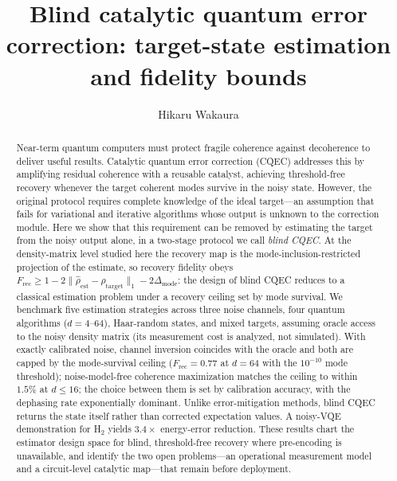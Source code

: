 \documentclass[pra,twocolumn,superscriptaddress,longbibliography,floatfix,nofootinbib]{revtex4-2}
\newcommand{\Frec}{F_\mathrm{rec}}
\newcommand{\rhot}{\rho_\mathrm{target}}
\newcommand{\rhoe}{\hat{\rho}_\mathrm{est}}
\begin{document}
\title{Blind catalytic quantum error correction: target-state estimation and fidelity bounds}

\author{Hikaru Wakaura}

\begin{abstract}
Near-term quantum computers must protect fragile coherence against decoherence to deliver useful results. 
Catalytic quantum error correction (CQEC) addresses this by amplifying residual coherence with a reusable catalyst, achieving threshold-free recovery whenever the target coherent modes survive in the noisy state. 
However, the original protocol requires complete knowledge of the ideal target---an assumption that fails for variational and iterative algorithms whose output is unknown to the correction module.
Here we show that this requirement can be removed by estimating the target from the noisy output alone, in a two-stage protocol we call \emph{blind CQEC}.
At the density-matrix level studied here the recovery map is the mode-inclusion-restricted projection of the estimate, so recovery fidelity obeys $\Frec \geq 1 - 2\|\rhoe - \rhot\|_1 - 2\Delta_\mathrm{mode}$: the design of blind CQEC reduces to a classical estimation problem under a recovery ceiling set by mode survival.  
We benchmark five estimation strategies across three noise channels, four quantum algorithms ($d = 4$--$64$), Haar-random states, and mixed targets, assuming oracle access to the noisy density matrix (its measurement cost is analyzed, not simulated).
With exactly calibrated noise, channel inversion coincides with the oracle and both are capped by the mode-survival ceiling ($\Frec = 0.77$ at $d = 64$ with the $10^{-10}$ mode threshold); noise-model-free coherence maximization matches the ceiling to within $1.5\%$ at $d \leq 16$; the choice between them is set by calibration accuracy, with the dephasing rate exponentially dominant.
Unlike error-mitigation methods, blind CQEC returns the state itself rather than corrected expectation values.
A noisy-VQE demonstration for H$_2$ yields $3.4\times$ energy-error reduction.
These results chart the estimator design space for blind, threshold-free recovery where pre-encoding is unavailable, and identify the two open problems---an operational measurement model and a circuit-level catalytic map---that remain before deployment.
\end{abstract}
 
\maketitle
\end{document}
